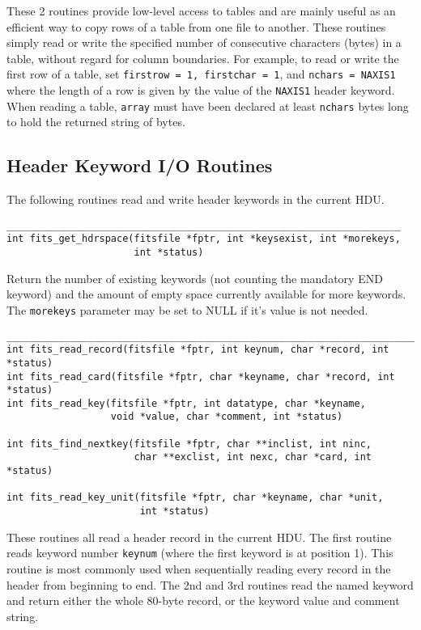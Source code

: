 \documentclass[11pt]{article}
\begin{document}
These 2 routines provide low-level access to tables and are mainly
useful as an efficient way to copy rows of a table from one file to
another.  These routines simply read or write the specified number of
consecutive characters (bytes) in a table, without regard for column
boundaries.  For example, to read or write the first row of a table,
set {\tt firstrow = 1, firstchar = 1}, and {\tt nchars = NAXIS1} where
the length of a row is given by the value of the {\tt NAXIS1} header
keyword.  When reading a table, {\tt array} must have been declared at
least {\tt nchars} bytes long to hold the returned string of bytes.

\newpage
\subsection{Header Keyword I/O Routines}
\nopagebreak
The following routines read and write header keywords in the current HDU.
\nopagebreak

\begin{verbatim}
____________________________________________________________________
int fits_get_hdrspace(fitsfile *fptr, int *keysexist, int *morekeys,
                      int *status)
\end{verbatim}
\nopagebreak
Return the number of existing keywords (not counting the mandatory END
keyword) and the amount of empty space currently available for more
keywords. The {\tt morekeys} parameter may be set to NULL if it's value is
not needed.

\begin{verbatim}
___________________________________________________________________________
int fits_read_record(fitsfile *fptr, int keynum, char *record, int *status)
int fits_read_card(fitsfile *fptr, char *keyname, char *record, int *status)
int fits_read_key(fitsfile *fptr, int datatype, char *keyname,
                  void *value, char *comment, int *status)

int fits_find_nextkey(fitsfile *fptr, char **inclist, int ninc,
                      char **exclist, int nexc, char *card, int *status)

int fits_read_key_unit(fitsfile *fptr, char *keyname, char *unit, 
                       int *status)
\end{verbatim}

These routines all read a header record in the current HDU. The first
routine reads keyword number {\tt keynum} (where the first keyword is
at position 1).  This routine is most commonly used when sequentially
reading every record in the header from beginning to end.  The 2nd and
3rd routines read the named keyword and return either the whole
80-byte record, or the keyword value and comment string.
\end{document}

